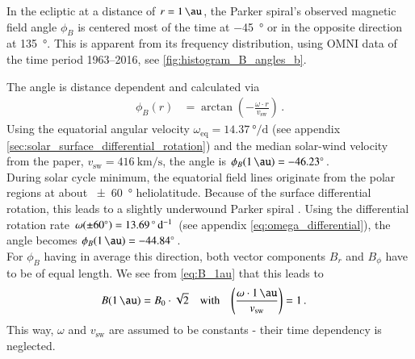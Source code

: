 In the ecliptic at a distance of $r = \SI{1}{\au}$, the Parker spiral's observed magnetic field angle $\phi_B$ is centered most of the time at \SI{-45}{\degree} or in the opposite direction at \SI{135}{\degree}. This is apparent from its frequency distribution, using OMNI data of the time period 1963--2016, see \autoref{fig:histogram_B_angles_b}.\\
\begin{figure}[htb]
\end{figure}
The angle is distance dependent and calculated via
\begin{align}
	\phi_B(r) &= \arctan\left(-\frac{\omega \cdot r}{v_\text{sw}}\right)\,.
\end{align}
Using the equatorial angular velocity $\omega_\text{eq} = \SI{14.37}{\degree\per\day}$ (see appendix \autoref{sec:solar_surface_differential_rotation}) and the median solar-wind velocity from the paper, $v_\text{sw} = \SI{416}{\km\per\s}$, the angle is $\phi_B(\SI{1}{\au}) = \SI{-46.23}{\degree}$.\\

During solar cycle minimum, the equatorial field lines originate from the polar regions at about \SI{+-60}{\degree} heliolatitude. Because of the surface differential rotation, this leads to a slightly underwound Parker spiral \citep{Banaszkiewicz1998}. Using the differential rotation rate $\omega(\SI{+-60}{\degree}) = \SI{13.69}{\degree\per\day}$ (see appendix \autoref{eq:omega_differential}), the angle becomes $\phi_B(\SI{1}{\au}) = \SI{-44.84}{\degree}$.\\

For $\phi_B$ having in average this direction, both vector components $B_r$ and $B_\phi$ have to be of equal length. We see from \autoref{eq:B_1au} that this leads to
\begin{align}
	B(\SI{1}{\au}) &= B_0 \cdot \sqrt{2}	&\text{with}	&	&	\left(\frac{\omega\cdot\SI{1}{\au}}{v_\text{sw}}\right) &= 1\,.
\end{align}
This way, $\omega$ and $v_\text{sw}$ are assumed to be constants - their time dependency is neglected.\\

